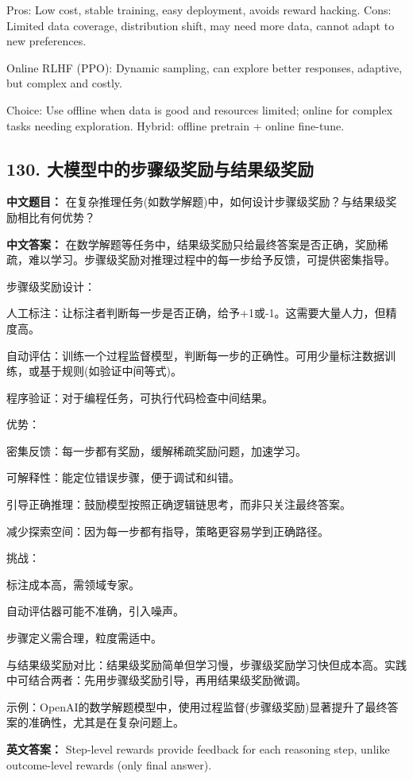 \documentclass[10pt,a4paper]{ctexart}
\begin{document}
Pros: Low cost, stable training, easy deployment, avoids reward hacking.
Cons: Limited data coverage, distribution shift, may need more data, cannot adapt to new preferences.

Online RLHF (PPO): Dynamic sampling, can explore better responses, adaptive, but complex and costly.

Choice: Use offline when data is good and resources limited; online for complex tasks needing exploration. Hybrid: offline pretrain + online fine-tune.

\subsection*{130. 大模型中的步骤级奖励与结果级奖励}
\textbf{中文题目：} 在复杂推理任务(如数学解题)中，如何设计步骤级奖励？与结果级奖励相比有何优势？

\textbf{中文答案：}
在数学解题等任务中，结果级奖励只给最终答案是否正确，奖励稀疏，难以学习。步骤级奖励对推理过程中的每一步给予反馈，可提供密集指导。

步骤级奖励设计：

人工标注：让标注者判断每一步是否正确，给予+1或-1。这需要大量人力，但精度高。

自动评估：训练一个过程监督模型，判断每一步的正确性。可用少量标注数据训练，或基于规则(如验证中间等式)。

程序验证：对于编程任务，可执行代码检查中间结果。

优势：

密集反馈：每一步都有奖励，缓解稀疏奖励问题，加速学习。

可解释性：能定位错误步骤，便于调试和纠错。

引导正确推理：鼓励模型按照正确逻辑链思考，而非只关注最终答案。

减少探索空间：因为每一步都有指导，策略更容易学到正确路径。

挑战：

标注成本高，需领域专家。

自动评估器可能不准确，引入噪声。

步骤定义需合理，粒度需适中。

与结果级奖励对比：结果级奖励简单但学习慢，步骤级奖励学习快但成本高。实践中可结合两者：先用步骤级奖励引导，再用结果级奖励微调。

示例：OpenAI的数学解题模型中，使用过程监督(步骤级奖励)显著提升了最终答案的准确性，尤其是在复杂问题上。

\textbf{英文答案：}
Step-level rewards provide feedback for each reasoning step, unlike outcome-level rewards (only final answer).
\end{document}
